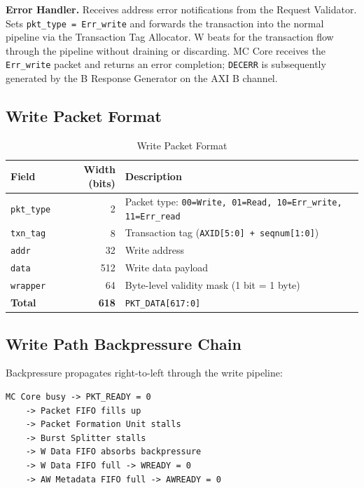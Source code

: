 \documentclass[11pt, a4paper]{article}
\begin{document}
\textbf{Error Handler.}
Receives address error notifications from the Request Validator. Sets \texttt{pkt\_type = Err\_write} and forwards the transaction into the normal pipeline via the Transaction Tag Allocator. W beats for the transaction flow through the pipeline without draining or discarding. MC Core receives the \texttt{Err\_write} packet and returns an error completion; \texttt{DECERR} is subsequently generated by the B Response Generator on the AXI B channel.

\subsection{Write Packet Format}

\begin{table}[h]
\centering
\begin{tabular}{lrl}
\toprule
\textbf{Field} & \textbf{Width (bits)} & \textbf{Description} \\
\midrule
\texttt{pkt\_type} & 2   & Packet type: \texttt{00=Write, 01=Read, 10=Err\_write, 11=Err\_read} \\
\texttt{txn\_tag}  & 8   & Transaction tag (\texttt{AXID[5:0] + seqnum[1:0]}) \\
\texttt{addr}      & 32  & Write address \\
\texttt{data}      & 512 & Write data payload \\
\texttt{wrapper}   & 64  & Byte-level validity mask (1 bit = 1 byte) \\
\midrule
\textbf{Total}     & \textbf{618} & \texttt{PKT\_DATA[617:0]} \\
\bottomrule
\end{tabular}
\caption{Write Packet Format}
\end{table}

\subsection{Write Path Backpressure Chain}

Backpressure propagates right-to-left through the write pipeline:

\begin{lstlisting}
MC Core busy -> PKT_READY = 0
    -> Packet FIFO fills up
    -> Packet Formation Unit stalls
    -> Burst Splitter stalls
    -> W Data FIFO absorbs backpressure
    -> W Data FIFO full -> WREADY = 0
    -> AW Metadata FIFO full -> AWREADY = 0
\end{lstlisting}
\end{document}
